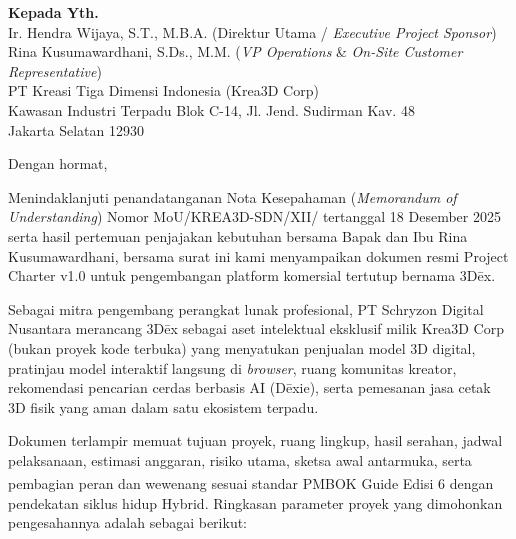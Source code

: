 \documentclass[11pt,a4paper]{article}
\begin{document}
\vspace{12pt}

\noindent
\textbf{Kepada Yth.} \\
Ir. Hendra Wijaya, S.T., M.B.A. (Direktur Utama / \textit{Executive Project Sponsor}) \\
Rina Kusumawardhani, S.Ds., M.M. (\textit{VP Operations} \& \textit{On-Site Customer Representative}) \\
PT Kreasi Tiga Dimensi Indonesia (Krea3D Corp) \\
Kawasan Industri Terpadu Blok C-14, Jl. Jend. Sudirman Kav. 48 \\
Jakarta Selatan 12930

\vspace{12pt}

\noindent
Dengan hormat,

Menindaklanjuti penandatanganan Nota Kesepahaman (\textit{Memorandum of Understanding}) Nomor MoU/\allowbreak KREA3D-\allowbreak SDN/\allowbreak XII/ tertanggal 18 Desember 2025 serta hasil pertemuan penjajakan kebutuhan bersama Bapak dan Ibu Rina Kusumawardhani, bersama surat ini kami menyampaikan dokumen resmi Project Charter v1.0 untuk pengembangan platform komersial tertutup bernama 3D\={e}x.

Sebagai mitra pengembang perangkat lunak profesional, PT Schryzon Digital Nusantara merancang 3D\={e}x sebagai aset intelektual eksklusif milik Krea3D Corp (bukan proyek kode terbuka) yang menyatukan penjualan model 3D digital, pratinjau model interaktif langsung di \textit{browser}, ruang komunitas kreator, rekomendasi pencarian cerdas berbasis AI (D\={e}xie), serta pemesanan jasa cetak 3D fisik yang aman dalam satu ekosistem terpadu.

Dokumen terlampir memuat tujuan proyek, ruang lingkup, hasil serahan, jadwal pelaksanaan, estimasi anggaran, risiko utama, sketsa awal antarmuka, serta pembagian peran dan wewenang sesuai standar PMBOK\textsuperscript{\textregistered} Guide Edisi 6 dengan pendekatan siklus hidup Hybrid. Ringkasan parameter proyek yang dimohonkan pengesahannya adalah sebagai berikut:

\clearpage

\hypersetup{linkcolor=black,urlcolor=black,citecolor=black}
\end{document}
